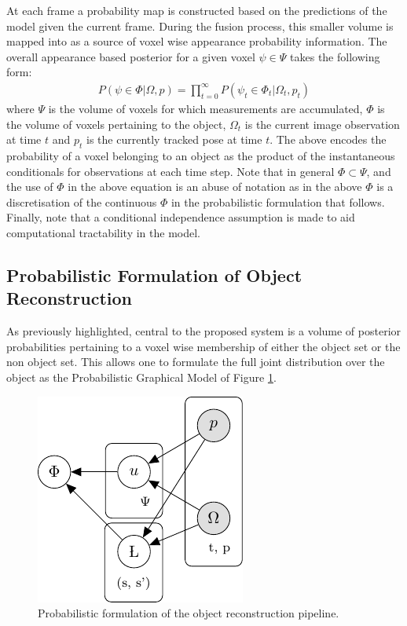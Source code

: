 At each frame a probability map is constructed based on the predictions of the model given the current frame. During the fusion process, this 
smaller volume is mapped into as a source of voxel wise appearance probability information. The overall appearance based posterior for a given voxel 
$\psi \in \Psi$ takes the following form:
\begin{equation}
\begin{split}
P(\psi \in \Phi | \Omega, p) = \prod_{t=0}^{\infty} P(\psi_{t} \in \Phi_{t} | \Omega_{t}, p_{t})
\end{split}
\end{equation}
where $\Psi$ is the volume of voxels for which measurements are accumulated, $\Phi$ 
is the volume of voxels pertaining to the object, $\Omega_{t}$ is the current image observation at time $t$ and $p_{t}$ is the 
currently tracked pose at time $t$.
The above encodes the probability of a voxel belonging to an object as the product of the instantaneous conditionals for observations at each time step. 
Note that in general $\Phi \subset \Psi$, and the use of $\Phi$ in the above equation is an abuse of notation as in the above 
$\Phi$ is a discretisation of the continuous $\Phi$ in the probabilistic formulation that follows. Finally, note that a conditional 
independence assumption is made to aid computational tractability in the model.

\subsection{Probabilistic Formulation of Object Reconstruction}
As previously highlighted, central to the proposed system is a volume of posterior probabilities pertaining to a voxel wise membership of either the 
object set or the non object set. This allows one to formulate the full joint distribution over the object as the Probabilistic 
Graphical Model of Figure \ref{pgm1}.
\begin{figure}[!t]
	\centering
	\includegraphics{graphical_models/pgm1.pdf}
	\caption{Probabilistic formulation of the object reconstruction pipeline.}
	\label{pgm1}
\end{figure}

